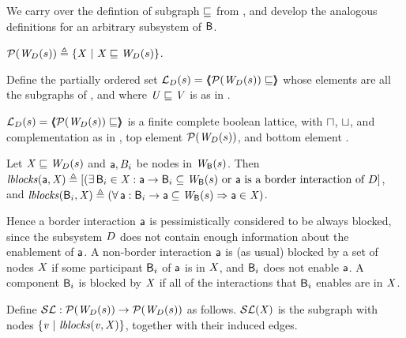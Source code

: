 We carry over the defintion of subgraph $\subg$ from , and develop the analogous definitions for an arbitrary subsystem
of $\B$.


\begin{definition} \label{defn:wsetOfSubgraphsLoc}
$\lwfgS{B}{s}{\DS} \df  \set{ \XS \stt \XS \subg \lwfg{B}{s}{\DS} }$.
\end{definition}

\begin{definition} \label{defn:wflatticeLoc}
Define the partially ordered set 
$\llat{\B}{s}{\DS}  = \tpl{ \lwfgS{B}{s}{\DS}  \subg }$ 
whose elements are all the subgraphs of 
, and where  $\US \subg \VS$ is as in .   
\end{definition}

\begin{proposition} \label{prop:isALatticeLoc}
$\llat{\B}{s}{\DS}  = \tpl{ \lwfgS{B}{s}{\DS}  \subg }$
 is a finite complete boolean lattice, with $\meet$, $\join$, and complementation as in 
, top element $\lwfgS{B}{s}{\DS}$, and bottom element \ewfg.
\end{proposition}

\begin{definition} \label{defn:blocksLoc}
Let $\XS \subg \lwfg{\B}{s}{\DS}$ and $\act, B_i$ be nodes in $\wfg{\B}{s}$. Then 
$\lblocks{\act}{\XS} \df
[ (\ex \B_i \in \XS : \act \ar \B_i \sub \wfg{\B}{s}
   \mbox{ or $\act$ is a border interaction of $\DS$} ]$, and 
$\lblocks{\B_i}{\XS} \df (\fa \act : \B_i \ar \act \sub\wfg{\B}{s} \imp \act \in \XS)$.
\end{definition}
Hence a border interaction $\act$ is pessimistically considered to be always blocked, since
the subsystem $\DS$ does not contain enough information about the enablement of $\act$.
A non-border interaction $\act$ is (as usual) blocked by a set of nodes $\XS$ if some participant $\B_i$ of 
$\act$ is in $\XS$, and $\B_i$ does not enable $\act$.
A component $\B_i$ is blocked by $\XS$ if all of the interactions that $\B_i$ enables are in $\XS$.


\begin{definition}[$\lSFs$] \label{defn:scFixLoc}
Define $\lSFs:  \lwfgS{B}{s}{\DS}  \to  \lwfgS{B}{s}{\DS}$ as follows.
$\lSF{\XS}$ is the subgraph with nodes $\set{\ndv \stt \lblocks{\ndv}{\XS} }$, together with their induced edges.
\end{definition}


